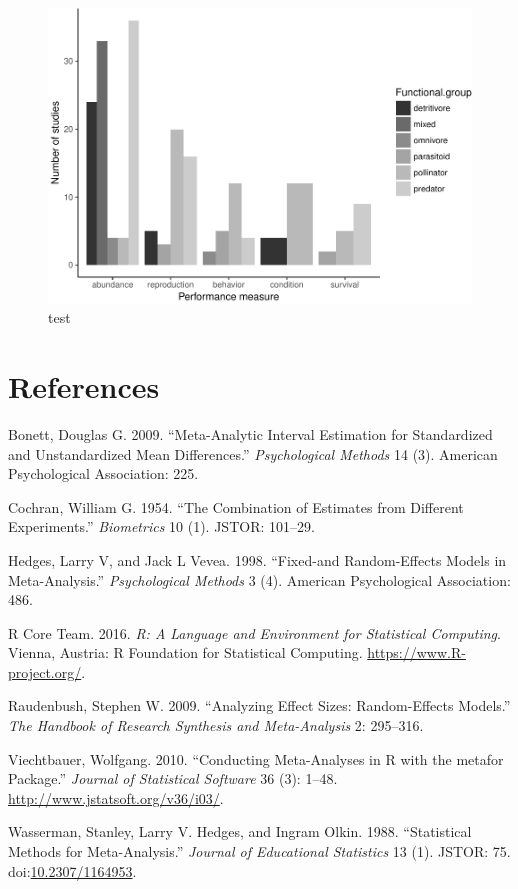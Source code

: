 \documentclass[]{elsarticle} %
\makeatletter
\def\maxwidth{\ifdim\Gin@nat@width>\linewidth\linewidth
\else\Gin@nat@width\fi}
\let\Oldincludegraphics\includegraphics
\renewcommand{\includegraphics}[1]{\Oldincludegraphics[width=\maxwidth]{#1}}
\makeatother
\begin{document}
\begin{figure}[htbp]
\centering
\includegraphics{MetanalysisNeonics_files/figure-latex/unnamed-chunk-17-1.pdf}
\caption{test}
\end{figure}

\section*{References}\label{references}

Bonett, Douglas G. 2009. ``Meta-Analytic Interval Estimation for
Standardized and Unstandardized Mean Differences.'' \emph{Psychological
Methods} 14 (3). American Psychological Association: 225.

Cochran, William G. 1954. ``The Combination of Estimates from Different
Experiments.'' \emph{Biometrics} 10 (1). JSTOR: 101--29.

Hedges, Larry V, and Jack L Vevea. 1998. ``Fixed-and Random-Effects
Models in Meta-Analysis.'' \emph{Psychological Methods} 3 (4). American
Psychological Association: 486.

R Core Team. 2016. \emph{R: A Language and Environment for Statistical
Computing}. Vienna, Austria: R Foundation for Statistical Computing.
\url{https://www.R-project.org/}.

Raudenbush, Stephen W. 2009. ``Analyzing Effect Sizes: Random-Effects
Models.'' \emph{The Handbook of Research Synthesis and Meta-Analysis} 2:
295--316.

Viechtbauer, Wolfgang. 2010. ``Conducting Meta-Analyses in R with the
metafor Package.'' \emph{Journal of Statistical Software} 36 (3): 1--48.
\url{http://www.jstatsoft.org/v36/i03/}.

Wasserman, Stanley, Larry V. Hedges, and Ingram Olkin. 1988.
``Statistical Methods for Meta-Analysis.'' \emph{Journal of Educational
Statistics} 13 (1). JSTOR: 75.
doi:\href{http://dx.doi.org/10.2307/1164953}{10.2307/1164953}.
\end{document}
